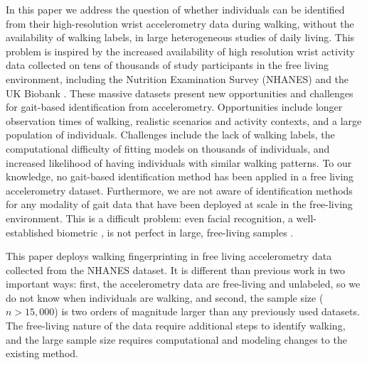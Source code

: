 In this paper we address the question of whether individuals can be identified from their high-resolution wrist accelerometry data during walking, without the availability of walking labels, in large heterogeneous studies of daily living.  This problem is inspired by the increased availability of high resolution wrist activity data collected on tens of thousands of study participants in the free living environment, including the Nutrition Examination Survey (NHANES) \citep{nhanes} and the UK Biobank \citep{UKB}. These massive datasets present new opportunities and challenges for gait-based identification from accelerometry. Opportunities include longer observation times of walking, realistic scenarios and activity contexts, and a large population of individuals. Challenges include the lack of walking labels, the computational difficulty of fitting models on thousands of individuals, and increased likelihood of having individuals with similar walking patterns. To our knowledge, no gait-based identification method has been applied in a free living accelerometry dataset. Furthermore, we are not aware of identification methods for any modality of gait data that have been deployed at scale in the free-living environment. This is a difficult problem: even facial recognition, a well-established biometric \citep{facial_recog}, is not perfect in large, free-living samples \citep{megaface}. 


This paper deploys walking fingerprinting in free living accelerometry data collected from the NHANES dataset. It is different than previous work in two important ways: first, the accelerometry data are free-living and unlabeled, so we do not know when individuals are walking, and second, the sample size ($n > 15{,}000$) is two orders of magnitude larger than any previously used datasets. The free-living nature of the data require additional steps to identify walking, and the large sample size requires computational and modeling changes to the existing method.


